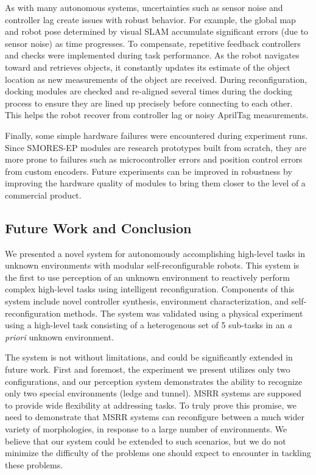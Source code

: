 \documentclass[conference]{IEEEtran}
\begin{document}
As with many autonomous systems, uncertainties such as sensor noise and controller lag create issues with robust behavior. For example, the global map and robot pose determined by visual SLAM accumulate significant errors (due to sensor noise) as time progresses. To compensate, repetitive feedback controllers and checks were implemented during task performance. As the robot navigates toward and retrieves objects, it constantly updates its estimate of the object location as new measurements of the object are received. During reconfiguration, docking modules are checked and re-aligned several times during the docking process to ensure they are lined up precisely before connecting to each other. This helps the robot recover from controller lag or noisy AprilTag measurements.

Finally, some simple hardware failures were encountered during experiment runs. Since SMORES-EP modules are research prototypes built from scratch, they are more prone to failures such as microcontroller errors and position control errors from custom encoders. Future experiments can be improved in robustness by improving the hardware quality of modules to bring them closer to the level of a commercial product.
%
\subsection{Future Work and Conclusion}
%
We presented a novel system for autonomously accomplishing high-level tasks in unknown environments with modular self-reconfigurable robots.  This system is the first to use perception of an unknown environment to reactively perform complex high-level tasks using intelligent reconfiguration. Components of this system include novel controller synthesis, environment characterization, and self-reconfiguration methods. The system was validated using a physical experiment using a high-level task consisting of a heterogenous set of 5 sub-tasks in an \textit{a priori} unknown environment. 

The system is not without limitations, and could be significantly extended in future work.  First and foremost, the experiment we present utilizes only two configurations, and our perception system demonstrates the ability to recognize only two special environments (ledge and tunnel).  MSRR systems are supposed to provide wide flexibility at addressing tasks. To truly prove this promise, we need to demonstrate that MSRR systems can reconfigure between a much wider variety of morphologies, in response to a large number of environments.  We believe that our system could be extended to such scenarios, but we do not minimize the difficulty of the problems one should expect to encounter in tackling these problems. 
\end{document}
